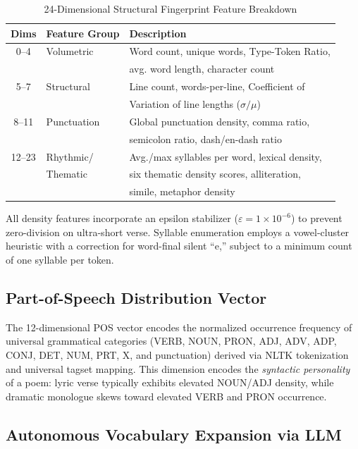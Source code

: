 \documentclass[conference]{IEEEtran}
\begin{document}
\begin{table}[htbp]
\caption{24-Dimensional Structural Fingerprint Feature Breakdown}
\label{tab:stylo}
\centering
\begin{tabular}{@{}cll@{}}
\toprule
\textbf{Dims} & \textbf{Feature Group} & \textbf{Description} \\
\midrule
0--4  & Volumetric   & Word count, unique words, Type-Token Ratio, \\
      &              & avg. word length, character count \\
5--7  & Structural   & Line count, words-per-line, Coefficient of \\
      &              & Variation of line lengths ($\sigma / \mu$) \\
8--11 & Punctuation  & Global punctuation density, comma ratio, \\
      &              & semicolon ratio, dash/en-dash ratio \\
12--23 & Rhythmic/   & Avg./max syllables per word, lexical density, \\
       & Thematic    & six thematic density scores, alliteration, \\
       &             & simile, metaphor density \\
\bottomrule
\end{tabular}
\end{table}

All density features incorporate an epsilon stabilizer
($\varepsilon = 1 \times 10^{-6}$) to prevent zero-division on
ultra-short verse. Syllable enumeration employs a vowel-cluster heuristic
with a correction for word-final silent ``e,'' subject to a minimum count
of one syllable per token.

\subsection{Part-of-Speech Distribution Vector}

The 12-dimensional POS vector encodes the normalized occurrence frequency
of universal grammatical categories (VERB, NOUN, PRON, ADJ, ADV, ADP,
CONJ, DET, NUM, PRT, X, and punctuation) derived via NLTK tokenization
and universal tagset mapping. This dimension encodes the \textit{syntactic
personality} of a poem: lyric verse typically exhibits elevated
NOUN/ADJ density, while dramatic monologue skews toward elevated VERB
and PRON occurrence.

\subsection{Autonomous Vocabulary Expansion via LLM}
\end{document}
